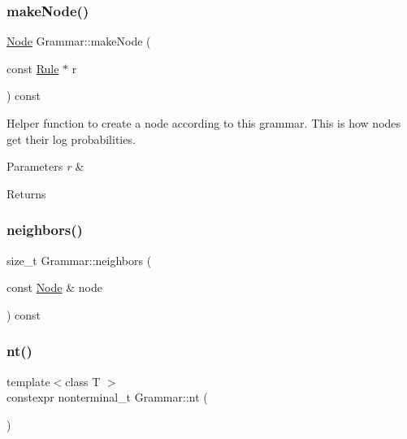 \subsubsection{\texorpdfstring{make\+Node()}{makeNode()}}
{\footnotesize\ttfamily \hyperlink{class_node}{Node} Grammar\+::make\+Node (\begin{DoxyParamCaption}\item[{const \hyperlink{class_rule}{Rule} $\ast$}]{r }\end{DoxyParamCaption}) const\hspace{0.3cm}{\ttfamily [inline]}}

Helper function to create a node according to this grammar. This is how nodes get their log probabilities. 
\begin{DoxyParams}{Parameters}
{\em r} & \\
\hline
\end{DoxyParams}
\begin{DoxyReturn}{Returns}

\end{DoxyReturn}
\mbox{\label{class_grammar_ae9115c2743b054ec44ef513843d84f5d}} 
\subsubsection{\texorpdfstring{neighbors()}{neighbors()}}
{\footnotesize\ttfamily size\+\_\+t Grammar\+::neighbors (\begin{DoxyParamCaption}\item[{const \hyperlink{class_node}{Node} \&}]{node }\end{DoxyParamCaption}) const\hspace{0.3cm}{\ttfamily [inline]}}

\mbox{\label{class_grammar_aa5c9afa0e7e1aa989b54402b02a677a3}} 
\subsubsection{\texorpdfstring{nt()}{nt()}}
{\footnotesize\ttfamily template$<$class T $>$ \\
constexpr nonterminal\+\_\+t Grammar\+::nt (\begin{DoxyParamCaption}{ }\end{DoxyParamCaption})\hspace{0.3cm}{\ttfamily [inline]}}

